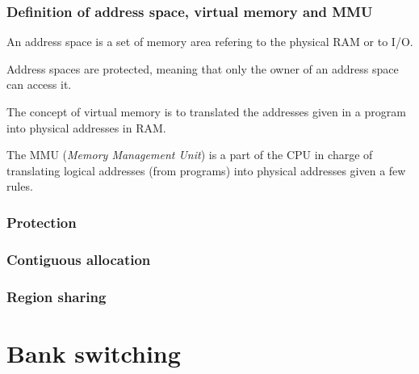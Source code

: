 \begin{frame}
  \frametitle{Definition of address space, virtual memory and MMU}

  An address space is a set of memory area refering to the physical
  RAM or to I/O.

  \-

  Address spaces are protected, meaning that only the owner of an
  address space can access it.

  \-

  The concept of virtual memory is to translated the addresses given
  in a program into physical addresses in RAM.

  \-

  The MMU (\emph{Memory Management Unit}) is a part of the CPU in
  charge of translating logical addresses (from programs) into
  physical addresses given a few rules.

\end{frame}


\begin{frame}
  \frametitle{Protection}

  \begin{center}
  \end{center}

\end{frame}


\begin{frame}
  \frametitle{Contiguous allocation}

  \begin{center}
  \end{center}

\end{frame}


\begin{frame}
  \frametitle{Region sharing}

  \begin{center}
  \end{center}

\end{frame}

%
%

\section{Bank switching}

